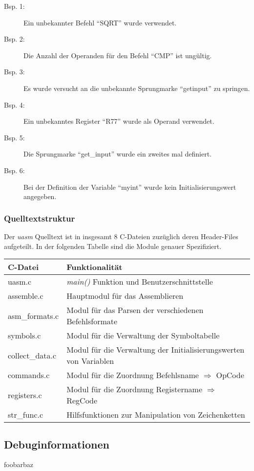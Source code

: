\begin{description}
    \item[Bsp. 1:] Ein unbekannter Befehl ``SQRT'' wurde verwendet.
    \item[Bsp. 2:] Die Anzahl der Operanden für den Befehl ``CMP'' ist ungültig.
    \item[Bsp. 3:] Es wurde versucht an die unbekannte Sprungmarke ``getinput''
                   zu springen.
    \item[Bsp. 4:] Ein unbekanntes Register ``R77'' wurde als Operand verwendet.
    \item[Bsp. 5:] Die Sprungmarke ``get\_input'' wurde ein zweites mal
                   definiert.
    \item[Bsp. 6:] Bei der Definition der Variable ``myint'' wurde kein
                   Initialisierungswert angegeben.
\end{description}

\subsubsection{Quelltextstruktur}

Der \emph{uasm} Quelltext ist in insgesamt 8 C-Dateien zuzüglich deren
Header-Files aufgeteilt. In der folgenden Tabelle sind die Module genauer
Spezifiziert.

\begin{center}
\begin{tabular}{ll}
C-Datei      & Funktionalität \\
\hline\hline
uasm.c          & \emph{main()} Funktion und Benutzerschnittstelle           \\
assemble.c      & Hauptmodul für das Assemblieren                            \\
asm\_formats.c  & Modul für das Parsen der verschiedenen Befehlsformate      \\
symbols.c       & Modul für die Verwaltung der Symboltabelle                 \\
collect\_data.c & Modul für die Verwaltung der Initialisierungswerten von Variablen \\
commands.c      & Modul für die Zuordnung Befehlsname $\Rightarrow$ OpCode   \\
registers.c     & Modul für die Zuordnung Registername $\Rightarrow$ RegCode \\
str\_func.c     & Hilfsfunktionen zur Manipulation von Zeichenketten         \\
\end{tabular}
\end{center}

\subsection{Debuginformationen}

foobarbaz
